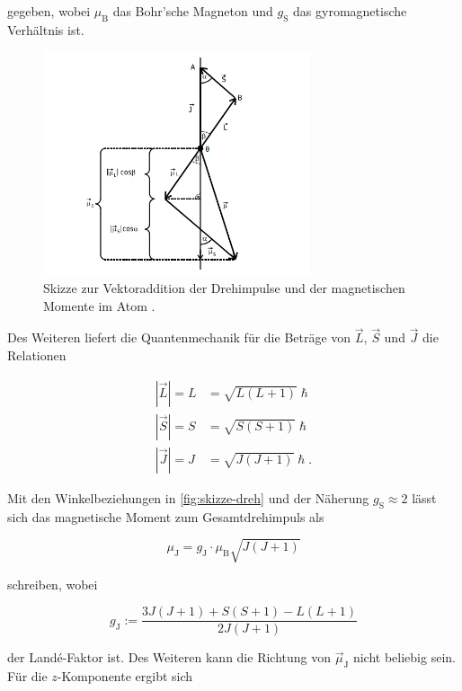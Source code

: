 gegeben, wobei $\mu_\text{B}$ das Bohr'sche Magneton und $g_\text{S}$ das gyromagnetische Verhältnis ist.

\begin{figure}
    \centering
    \includegraphics[width=0.70\textwidth]{content/skizze-drehimpuls.png}
    \caption{Skizze zur Vektoraddition der Drehimpulse und der magnetischen Momente im Atom \cite{V606}.}
    \label{fig:skizze-dreh}
\end{figure}

Des Weiteren liefert die Quantenmechanik für die Beträge von $\vec{L}$, $\vec{S}$ und $\vec{J}$ die Relationen

\begin{align} 
    |\vec{L}| = L &= \sqrt{ L ( L + 1 ) } \hslash \\
    |\vec{S}| = S &= \sqrt{ S ( S + 1 ) } \hslash \\
    |\vec{J}| = J &= \sqrt{ J ( J + 1 ) } \hslash.
\end{align}

Mit den Winkelbeziehungen in \autoref{fig:skizze-dreh} und der Näherung $g_\text{S} \approx 2$ lässt sich das magnetische Moment zum Gesamtdrehimpuls als

\begin{equation}
    \label{eqn:magn-moment}
    \mu_\text{J} = g_\text{J} \cdot \mu_\text{B} \sqrt{J (J + 1)}
\end{equation}

schreiben, wobei 

\begin{equation}
    \label{eqn:lande}
    g_\text{J} := \frac{ 3 J (J+1) + S(S+1) - L(L+1) }{ 2 J (J +1) }
\end{equation}

der Landé-Faktor ist.
Des Weiteren kann die Richtung von $\vec{\mu}_\text{J}$ nicht beliebig sein. Für die $z$-Komponente ergibt sich


